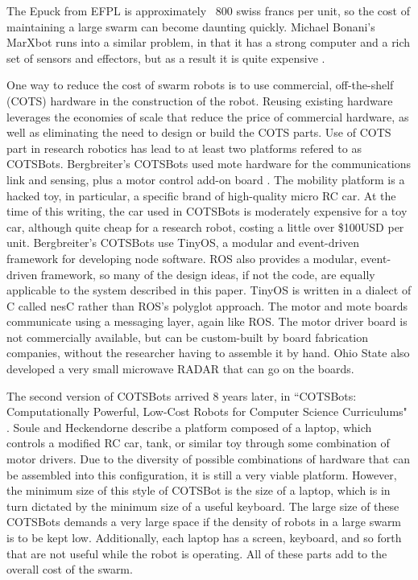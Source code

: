 \documentclass[]{article}
\begin{document}
The Epuck from EFPL is approximately ~800 swiss francs per unit, so the cost of maintaining a large swarm can become daunting quickly. 
Michael Bonani's MarXbot runs into a similar problem, in that it has a strong computer and a rich set of sensors and effectors, but as a result it is quite expensive \cite{bonani2010marxbot}. 

One way to reduce the cost of swarm robots is to use commercial, off-the-shelf (COTS) hardware in the construction of the robot. 
Reusing existing hardware leverages the economies of scale that reduce the price of commercial hardware, as well as eliminating the need to design or build the COTS parts. 
Use of COTS part in research robotics has lead to at least two platforms refered to as COTSBots.
Bergbreiter's COTSBots used mote hardware for the communications link and sensing, plus a motor control add-on board  \cite{bergbreiter2003cotsbots}. 
The mobility platform is a hacked toy, in particular, a specific brand of high-quality micro RC car.
At the time of this writing, the car used in COTSBots is moderately expensive for a toy car, although quite cheap for a research robot, costing a little over \$100USD per unit. 
Bergbreiter's COTSBots use TinyOS, a modular and event-driven framework for developing node software. 
ROS also provides a modular, event-driven framework, so many of the design ideas, if not the code, are equally applicable to the system described in this paper. 
TinyOS is written in a dialect of C called nesC rather than ROS's polyglot approach. The motor and mote boards communicate using a messaging layer, again like ROS. 
The motor driver board is not commercially available, but can be custom-built by board fabrication companies, without the researcher having to assemble it by hand. 
Ohio State also developed a very small microwave RADAR that can go on the boards.

The second version of COTSBots arrived 8 years later, in ``COTSBots: Computationally Powerful, Low-Cost Robots for Computer Science Curriculums" \cite{soule2011cotsbots}. Soule and Heckendorne describe a platform composed of a laptop, which controls a modified RC car, tank, or similar toy through some combination of motor drivers. 
Due to the diversity of possible combinations of hardware that can be assembled into this configuration, it is still a very viable platform. 
However, the minimum size of this style of COTSBot is the size of a laptop, which is in turn dictated by the minimum size of a useful keyboard. 
The large size of these COTSBots demands a very large space if the density of robots in a large swarm is to be kept low. 
Additionally, each laptop has a screen, keyboard, and so forth that are not useful while the robot is operating. 
All of these parts add to the overall cost of the swarm. 
\end{document}
